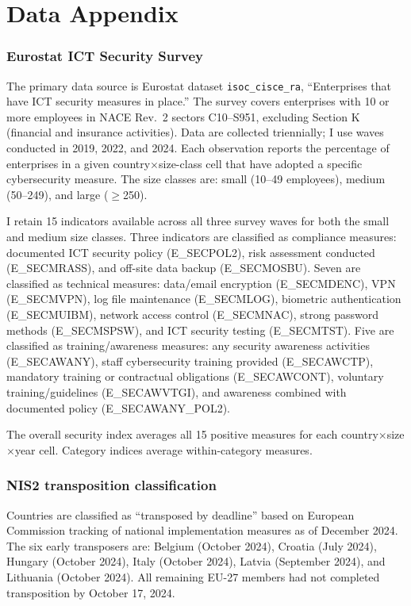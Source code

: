 \documentclass[12pt]{article}
\begin{document}
\section{Data Appendix}
\begin{sloppypar}

\subsubsection*{Eurostat ICT Security Survey} The primary data source is Eurostat dataset \texttt{isoc\_cisce\_ra}, ``Enterprises that have ICT security measures in place.'' The survey covers enterprises with 10 or more employees in NACE Rev.\ 2 sectors C10--S951, excluding Section K (financial and insurance activities). Data are collected triennially; I use waves conducted in 2019, 2022, and 2024. Each observation reports the percentage of enterprises in a given country$\times$size-class cell that have adopted a specific cybersecurity measure. The size classes are: small (10--49 employees), medium (50--249), and large ($\geq$250).

I retain 15 indicators available across all three survey waves for both the small and medium size classes. Three indicators are classified as compliance measures: documented ICT security policy (E\_SECPOL2), risk assessment conducted (E\_SECMRASS), and off-site data backup (E\_SECMOSBU). Seven are classified as technical measures: data/email encryption (E\_SECMDENC), VPN (E\_SECMVPN), log file maintenance (E\_SECMLOG), biometric authentication (E\_SECMUIBM), network access control (E\_SECMNAC), strong password methods (E\_SECMSPSW), and ICT security testing (E\_SECMTST). Five are classified as training/awareness measures: any security awareness activities (E\_SECAWANY), staff cybersecurity training provided (E\_SECAWCTP), mandatory training or contractual obligations (E\_SECAWCONT), voluntary training/guidelines (E\_SECAWVTGI), and awareness combined with documented policy (E\_SECAWANY\_POL2).

The overall security index averages all 15 positive measures for each country$\times$size$\times$year cell. Category indices average within-category measures.

\subsubsection*{NIS2 transposition classification} Countries are classified as ``transposed by deadline'' based on European Commission tracking of national implementation measures as of December 2024. The six early transposers are: Belgium (October 2024), Croatia (July 2024), Hungary (October 2024), Italy (October 2024), Latvia (September 2024), and Lithuania (October 2024). All remaining EU-27 members had not completed transposition by October 17, 2024.

\end{sloppypar}
\end{document}
